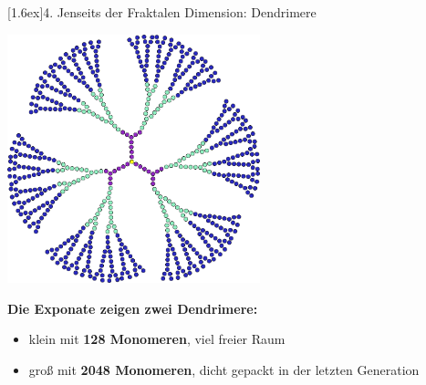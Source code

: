 \documentclass[final]{beamer}
\newlength{\columnheight}
\newlength{\marginw}
\newlength{\tw}
\newlength{\colw}
\newenvironment{myTwoColPoster}{%
  \begin{minipage}[t]{\textwidth}%
    \hspace*{\marginw}%
    \hspace*{9.5bp}%
    \begin{minipage}[t]{\tw}}%
  {\end{minipage}%
   \hspace*{\marginw}%
   \end{minipage}}
\newenvironment{myCol}%
    {\begin{minipage}[t][\columnheight][t]{\colw}}%
    {\end{minipage}}
\newenvironment{textblock}[1]%
    {\begin{block}{\rule[-0.6ex]{0pt}{2.4ex}\raisebox{-0.25ex}[1.6ex]{#1}}%
     \vspace*{5mm}}%
    {\vspace*{5mm}\end{block}}
\begin{document}
\begin{frame}[t]{}
\begin{myTwoColPoster}
\begin{myCol}
\begin{textblock}{4. Jenseits der Fraktalen Dimension: Dendrimere}
\begin{center}
      \includegraphics[width=0.55\textwidth]{fig/Dendrimer}
    \end{center}
    \begin{minipage}[c]{0.8\textwidth}
      \begin{center}\large
        \textbf{\textcolor{IPForange}{\Large Die Exponate zeigen zwei Dendrimere:}}
          \begin{itemize}\large
            \item klein mit \textbf{128 Monomeren}, viel freier Raum
            \item groß mit \textbf{2048 Monomeren}, dicht gepackt in der letzten Generation
          \end{itemize}
      \end{center}
    \end{minipage}\hfill
    \begin{minipage}[c]{0.19\textwidth}
    \end{minipage}
  \end{textblock}


\end{myCol}%
\end{myTwoColPoster}
\end{frame}
\end{document}

